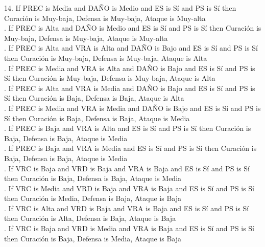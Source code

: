 {14. If PREC is Media and DAÑO is Medio and ES is Sí and PS is Sí then Curación is Muy-baja, Defensa is Muy-baja, Ataque is Muy-alta\\. If PREC is Alta and DAÑO is Medio and ES is Sí and PS is Sí then Curación is Muy-baja, Defensa is Muy-baja, Ataque is Muy-alta\\. If PREC is Alta and VRA is Alta and DAÑO is Bajo and ES is Sí and PS is Sí then Curación is Muy-baja, Defensa is Muy-baja, Ataque is Alta\\. If PREC is Media and VRA is Alta and DAÑO is Bajo and ES is Sí and PS is Sí then Curación is Muy-baja, Defensa is Muy-baja, Ataque is Alta\\. If PREC is Alta and VRA is Media and DAÑO is Bajo and ES is Sí and PS is Sí then Curación is Baja, Defensa is Baja, Ataque is Alta\\. If PREC is Media and VRA is Media and DAÑO is Bajo and ES is Sí and PS is Sí then Curación is Baja, Defensa is Baja, Ataque is Media\\. If PREC is Baja and VRA is Alta and ES is Sí and PS is Sí then Curación is Baja, Defensa is Baja, Ataque is Media\\. If PREC is Baja and VRA is Media and ES is Sí and PS is Sí then Curación is Baja, Defensa is Baja, Ataque is Media\\. If VRC is Baja and VRD is Baja and VRA is Baja and ES is Sí and PS is Sí then Curación is Baja, Defensa is Baja, Ataque is Media\\. If VRC is Media and VRD is Baja and VRA is Baja and ES is Sí and PS is Sí then Curación is Media, Defensa is Baja, Ataque is Baja\\. If VRC is Alta and VRD is Baja and VRA is Baja and ES is Sí and PS is Sí then Curación is Alta, Defensa is Baja, Ataque is Baja\\. If VRC is Baja and VRD is Media and VRA is Baja and ES is Sí and PS is Sí then Curación is Baja, Defensa is Media, Ataque is Baja\\\newline
}
